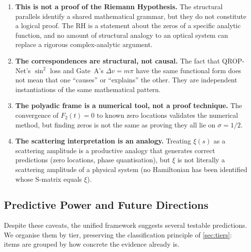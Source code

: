 \documentclass[11pt, a4paper]{article}
\theoremstyle{definition}
\theoremstyle{plain}
\newcommand{\xif}{\xi}                      %
\begin{document}
\begin{enumerate}
  \item \textbf{This is not a proof of the Riemann Hypothesis.}
        The structural parallels identify a shared mathematical grammar,
        but they do not constitute a logical proof. The RH is a statement
        about the zeros of a specific analytic function, and no amount of
        structural analogy to an optical system can replace a rigorous
        complex-analytic argument.

  \item \textbf{The correspondences are structural, not causal.}
        The fact that QROP-Net's $\sin^2$ loss and Gate~A's
        $\Delta v = m\pi$ have the same functional form does not mean
        that one ``causes'' or ``explains'' the other. They are
        independent instantiations of the same mathematical pattern.

  \item \textbf{The polyadic frame is a numerical tool, not a proof
        technique.} The convergence of $F_2(t) = 0$ to known zero
        locations validates the numerical method, but finding zeros
        is not the same as proving they all lie on $\sigma = 1/2$.

  \item \textbf{The scattering interpretation is an analogy.}
        Treating $\xif(s)$ as a scattering amplitude is a productive
        analogy that generates correct predictions (zero locations,
        phase quantisation), but $\xif$ is not literally a scattering
        amplitude of a physical system (no Hamiltonian has been
        identified whose S-matrix equals $\xif$).
\end{enumerate}


\subsection{Predictive Power and Future Directions}
\label{sec:open}

Despite these caveats, the unified framework suggests several testable
predictions. We organise them by tier, preserving the classification
principle of \cref{sec:tiers}: items are grouped by how concrete the
evidence already is.
\end{document}
